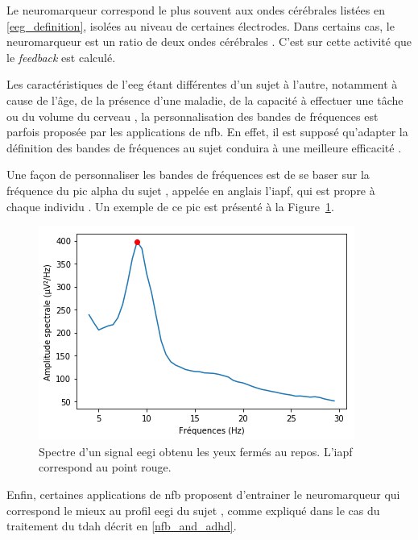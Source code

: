 Le neuromarqueur correspond le plus souvent aux ondes cérébrales listées en \ref{eeg_definition}, isolées au 
niveau de certaines électrodes. Dans certains cas, le neuromarqueur est un ratio de deux ondes cérébrales \citep{Gevensleben2009}. C'est sur cette activité que le \textit{feedback}
est calculé. 

Les caractéristiques de l'\gls{eeg} étant différentes d'un sujet à l'autre, notamment à cause de l'âge, de la présence d'une maladie, de la capacité à effectuer une tâche ou du volume 
du cerveau \citep{Enriquez2017, Klimesch1999, Moretti2004, Alkoby2017}, la personnalisation des bandes de fréquences est parfois proposée par les applications de \gls{nfb}. 
En effet, il est supposé qu'adapter la définition des bandes de fréquences au sujet conduira à une meilleure efficacité \citep{Enriquez2017}. 

Une façon de personnaliser les bandes de fréquences est de se baser sur la fréquence du pic alpha du sujet 
\citep{Alkoby2017, Escolano2014, Bazanova2018, Bioulac2019}, appelée en anglais l'\gls{iapf}, qui 
est propre à chaque individu \citep{Haegens2014, Aurlien2004, Smit2006}. Un exemple de ce pic est présenté à la Figure~\ref{Figure:introduction_iapf}.

\begin{figure}[h!]
  \centering
	\includegraphics[width=0.7\linewidth]{figures/chapter-1/introduction-iapf} 
  \caption[Spectre d'un signal \gls{eegi} obtenu les yeux fermés au repos.]{Spectre d'un signal \gls{eegi} obtenu les yeux fermés au repos. L'\gls{iapf} correspond au point rouge.}
  \label{Figure:introduction_iapf}
\end{figure}

Enfin, certaines applications de \gls{nfb} proposent d'entrainer le neuromarqueur qui correspond le mieux au profil \gls{eegi} du sujet 
\citep{Bioulac2019, Kerson2013}, comme expliqué dans le cas du traitement du \gls{tdah} décrit en \ref{nfb_and_adhd}. 

